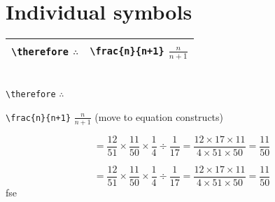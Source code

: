 \section{Individual symbols}



\begin{tabular}{|l|c|}
\hline
\verb|\therefore| $\therefore$ & \verb|\frac{n}{n+1}| $\frac{n}{n+1}$ \\
\hline
\end{tabular}\\
\verb|\therefore| $\therefore$



\verb|\frac{n}{n+1}| $\frac{n}{n+1}$    (move to equation constructs)


 \begin{equation*} 
= \frac{12}{51} \times \frac{11}{50} \times \frac{1}{4} \div \frac{1}{17} = \frac{12 \times 17 \times 11}{4 \times 51 \times 50} = \frac{11}{50}
 \end{equation*} 
 
 \begin{equation*} 
= \frac{12}{51} \times \frac{11}{50} \times \frac{1}{4} \div \frac{1}{17} = \frac{12 \times 17 \times 11}{4 \times 51 \times 50} = \frac{11}{50}
 \end{equation*} 
 fse 
